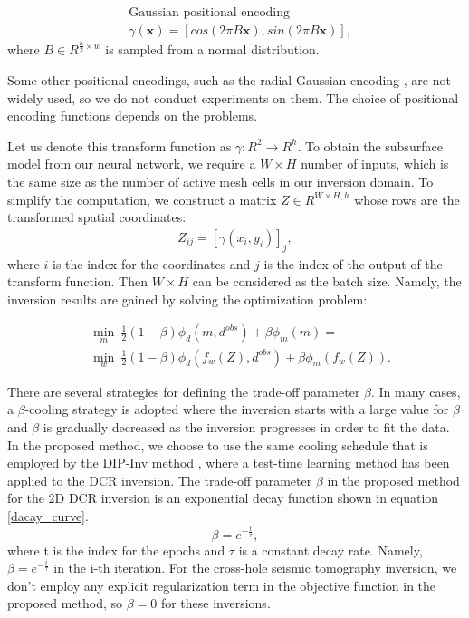 \documentclass[lettersize,journal]{IEEEtran}
\begin{document}
\begin{equation}
\label{Gaussian encoding}
\begin{aligned}
& \textrm{Gaussian positional encoding} \\
& \gamma(\textbf{x}) = [cos(2\pi B\textbf{x}), sin(2\pi B\textbf{x})],
\end{aligned}
\end{equation}
where $B \in R^{\frac{h}{2} \times w }$ is sampled from a normal distribution.

Some other positional encodings, such as the radial Gaussian encoding \cite{liu2022recoverycontinuous3drefractive}, are not widely used, so we do not conduct experiments on them. The choice of positional encoding functions depends on the problems.

Let us denote this transform function as $\gamma: R^2 \rightarrow R^{h}$.
To obtain the subsurface model from our neural network, we require a $W \times H$ number of inputs, which is the same size as the number of active mesh cells in our inversion domain.
To simplify the computation, we construct a matrix $Z \in R^{W \times H, h}$ whose rows are the transformed spatial coordinates:
\begin{equation}
\begin{aligned}
Z_{ij} = [\gamma(x_i, y_i)]_j,
\end{aligned}
\end{equation}
where $i$ is the index for the coordinates and $j$ is the index of the output of the transform function.
Then $W \times H$ can be considered as the batch size. Namely, the inversion results are gained by solving the optimization problem:

\begin{equation}
\label{proposed_objective}
\begin{aligned}
&\min_m \:\frac{1}{2}(1-\beta)\phi_{d}(m, d^{obs}) + \beta \phi_{m}(m)= \\
&\min_w \:\frac{1}{2}(1-\beta)\phi_{d}(f_{w}(Z), d^{obs}) + \beta \phi_{m}(f_{w}(Z)).
\end{aligned}
\end{equation}

There are several strategies for defining the trade-off parameter $\beta$. In many cases, a $\beta$-cooling strategy is adopted where the inversion starts with a large value for $\beta$ and $\beta$ is gradually decreased as the inversion progresses in order to fit the data. In the proposed method, we choose to use the same cooling schedule that is employed by the DIP-Inv method \cite{27}, where a test-time learning method has been applied to the DCR inversion. The trade-off parameter $\beta$ in the proposed method for the 2D DCR inversion is an exponential decay function shown in equation \ref{dacay_curve}.
\begin{equation}
\label{dacay_curve}
\beta = e^{-\frac{t}{\tau}},
\end{equation}
where t is the index for the epochs and $\tau$ is a constant decay rate. Namely, $\beta = e^{-\frac{i}{\tau}}$ in the i-th iteration. For the cross-hole seismic tomography inversion, we don't employ any explicit regularization term in the objective function in the proposed method, so $\beta = 0$ for these inversions.
\end{document}
